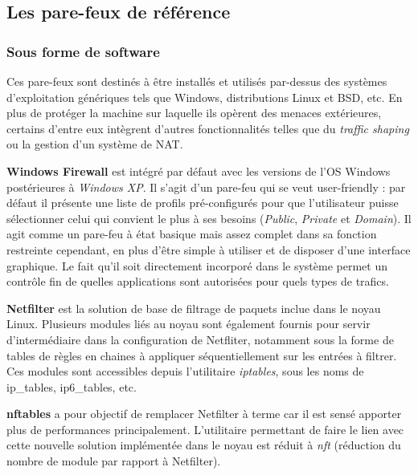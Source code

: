 \documentclass[]{article}
\newcommand{\minit}[1]{\noindent{\small\textbf{ \underline{#1}}}\vspace{0.2cm}}
\begin{document}
\newpage
\subsection{Les pare-feux de référence}

\subsubsection{Sous forme de software}

\par Ces pare-feux sont destinés à être installés et utilisés par-dessus des systèmes d'exploitation génériques tels que Windows, distributions Linux et BSD, etc. En plus de protéger la machine sur laquelle ils opèrent des menaces extérieures, certains d'entre eux intègrent d'autres fonctionnalités telles que du \textit{traffic shaping} ou la gestion d'un système de NAT.\\

\minit{Windows}

\par \textbf{Windows Firewall} est intégré par défaut avec les versions de l'OS Windows postérieures à \textit{Windows XP}. Il s'agit d'un pare-feu qui se veut \og user-friendly \fg : par défaut il présente une liste de profils pré-configurés pour que l'utilisateur puisse sélectionner celui qui convient le plus à ses besoins (\textit{Public}, \textit{Private} et \textit{Domain}). Il agit comme un pare-feu à état basique mais assez complet dans sa fonction restreinte cependant, en plus d'être simple à utiliser et de disposer d'une interface graphique. Le fait qu'il soit directement incorporé dans le système permet un contrôle fin de quelles applications sont autorisées pour quels types de trafics.\\

\minit{Linux}

\par \textbf{Netfilter} est la solution de base de filtrage de paquets inclue dans le noyau Linux. Plusieurs modules liés au noyau sont également fournis pour servir d'intermédiaire dans la configuration de Netfliter, notamment sous la forme de tables de règles en chaines à appliquer séquentiellement sur les entrées à filtrer. Ces modules sont accessibles depuis l'utilitaire \textit{iptables}, sous les noms de ip\_tables, ip6\_tables, etc.\\

\par \textbf{nftables} a pour objectif de remplacer Netfilter à terme car il est sensé apporter plus de performances principalement. L'utilitaire permettant de faire le lien avec cette nouvelle solution implémentée dans le noyau est réduit à \textit{nft} (réduction du nombre de module par rapport à Netfilter).\\
\end{document}
